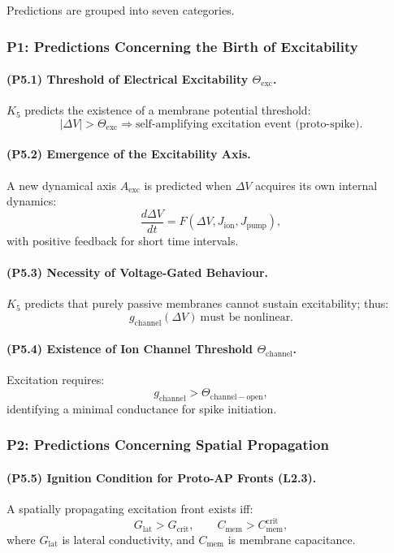 Predictions are grouped into seven categories.

\subsubsection{P1: Predictions Concerning the Birth of Excitability}

\paragraph{(P5.1) Threshold of Electrical Excitability $\Theta_{\mathrm{exc}}$.}
$K_5$ predicts the existence of a membrane potential threshold:
\[
|\Delta V| > \Theta_{\mathrm{exc}}
\Rightarrow \text{self-amplifying excitation event (proto-spike)}.
\]

\paragraph{(P5.2) Emergence of the Excitability Axis.}
A new dynamical axis $A_{\mathrm{exc}}$ is predicted when $\Delta V$ acquires
its own internal dynamics:
\[
\frac{d \Delta V}{dt} = F(\Delta V, J_{\mathrm{ion}},J_{\mathrm{pump}}),
\]
with positive feedback for short time intervals.

\paragraph{(P5.3) Necessity of Voltage-Gated Behaviour.}
$K_5$ predicts that purely passive membranes cannot sustain excitability; thus:
\[
g_{\mathrm{channel}}(\Delta V) \ \text{must be nonlinear.}
\]

\paragraph{(P5.4) Existence of Ion Channel Threshold $\Theta_{\mathrm{channel}}$.}
Excitation requires:
\[
g_{\mathrm{channel}} > \Theta_{\mathrm{channel-open}},
\]
identifying a minimal conductance for spike initiation.

\subsubsection{P2: Predictions Concerning Spatial Propagation}

\paragraph{(P5.5) Ignition Condition for Proto-AP Fronts (L2.3).}
A spatially propagating excitation front exists iff:
\[
G_{\mathrm{lat}} > G_{\mathrm{crit}},
\qquad
C_{\mathrm{mem}} > C_{\mathrm{mem}}^{\mathrm{crit}},
\]
where $G_{\mathrm{lat}}$ is lateral conductivity, and $C_{\mathrm{mem}}$ is
membrane capacitance.

